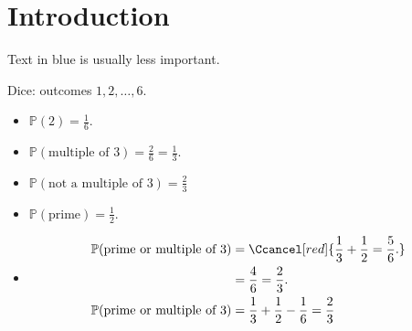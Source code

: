\section{Introduction}
Text in blue is usually less important.

\begin{example} \label{exm:0}
    Dice: outcomes $1, 2, \dots, 6$.
    \begin{itemize}
        \item $\mathbb{P}(2) = \frac{1}{6}.$
        \item $\mathbb{P}(\text{multiple of }3) = \frac{2}{6} = \frac{1}{3}.$
        \item $\mathbb{P}(\text{not a multiple of }3) = \frac{2}{3}$
        \item $\mathbb{P}(\text{prime}) = \frac{1}{2}.$
        \item \begin{align*}
            \mathbb{P}(\text{prime or multiple of 3}) &= \Ccancel[red]{\frac{1}{3} + \frac{1}{2} = \frac{5}{6}.} \\
            &= \frac{4}{6} = \frac{2}{3}. \\
            \mathbb{P}(\text{prime or multiple of 3}) &= \frac{1}{3} + \frac{1}{2} - \frac{1}{6} = \frac{2}{3}
        \end{align*} 
    \end{itemize} 
\end{example}